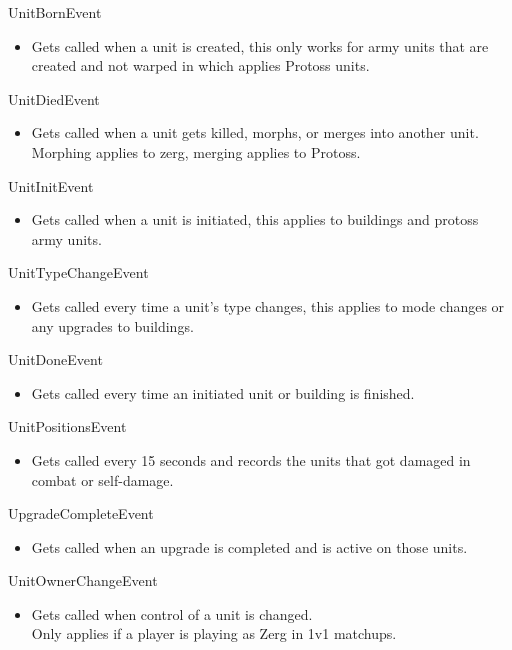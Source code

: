 \documentclass[a4paper,12pt]{report}
\begin{document}
\vspace*{-.4cm}
UnitBornEvent
\begin{itemize}[,]
    \setlength\itemsep{-.1cm}
    \item Gets called when a unit is created, this only works for army units that are created and not warped in which applies Protoss units.
\end{itemize}
\vspace*{-.4cm}
UnitDiedEvent
\begin{itemize}[,]
    \setlength\itemsep{-.1cm}
    \item Gets called when a unit gets killed, morphs, or merges into another unit. Morphing applies to zerg, merging applies to Protoss.
\end{itemize}
\vspace*{-.4cm}
UnitInitEvent
\begin{itemize}[,]
    \setlength\itemsep{-.1cm}
    \item Gets called when a unit is initiated, this applies to buildings and protoss army units.
\end{itemize}
\vspace*{-.4cm}
UnitTypeChangeEvent
\begin{itemize}[,]
    \setlength\itemsep{-.1cm}
    \item Gets called every time a unit’s type changes, this applies to mode changes or any upgrades to buildings.
\end{itemize}
\vspace*{-.4cm}
UnitDoneEvent
\begin{itemize}[,]
    \setlength\itemsep{-.1cm}
    \item Gets called every time an initiated unit or building is finished.
\end{itemize}
\vspace*{-.4cm}
UnitPositionsEvent
\begin{itemize}[,]
    \setlength\itemsep{-.1cm}
    \item Gets called every 15 seconds and records the units that got damaged in combat or self-damage.
\end{itemize}
\vspace*{-.4cm}
UpgradeCompleteEvent
\begin{itemize}[,]
    \setlength\itemsep{-.1cm}
    \item Gets called when an upgrade is completed and is active on those units.
\end{itemize}
\vspace*{-.4cm}
UnitOwnerChangeEvent
\begin{itemize}[,]
    \setlength\itemsep{-.1cm}
    \item Gets called when control of a unit is changed. \\
    Only applies if a player is playing as Zerg in 1v1 matchups.
\end{itemize}
\end{document}
